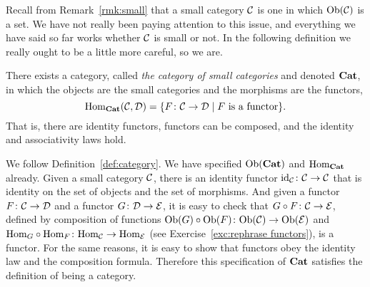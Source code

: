 \documentclass[CT4S-EN-RU]{subfiles}
\begin{document}
\begin{remarkRUS}
\end{remarkRUS}


\subsubsection{}\label{sec:cat of cats}

\begin{blockENG}
Recall from Remark~\ref{rmk:small} that a small category $\mathcal{C}$ is one in which $\textnormal{Ob}(\mathcal{C})$ is a set. We have not really been paying attention to this issue, and everything we have said so far works whether $\mathcal{C}$ is small or not. In the following definition we really ought to be a little more careful, so we are. 
\end{blockENG}

\begin{blockRUS}
\end{blockRUS}

\begin{propositionENG}
There exists a category, called {\em the category of small categories} and denoted ${\mathbf{Cat}}$, in which the objects are the small categories and the morphisms are the functors, $$\textnormal{Hom}_{\mathbf{Cat}}(\mathcal{C},\mathcal{D})=\{F\colon\mathcal{C}\rightarrow\mathcal{D}{\;|\;} F \textnormal{ is a functor}\}.$$ That is, there are identity functors, functors can be composed, and the identity and associativity laws hold.
\end{propositionENG}

\begin{propositionRUS}
\end{propositionRUS}

\begin{proofENG}
We follow Definition~\ref{def:category}. We have specified $\textnormal{Ob}({\mathbf{Cat}})$ and $\textnormal{Hom}_{\mathbf{Cat}}$ already. Given a small category $\mathcal{C}$, there is an identity functor $\textnormal{id}_\mathcal{C}\colon\mathcal{C}\rightarrow\mathcal{C}$ that is identity on the set of objects and the set of morphisms. And given a functor $F\colon\mathcal{C}\rightarrow\mathcal{D}$ and a functor $G\colon\mathcal{D}\rightarrow\mathcal{E}$, it is easy to check that $G\circ F\colon \mathcal{C}\rightarrow\mathcal{E}$, defined by composition of functions $\textnormal{Ob}(G)\circ\textnormal{Ob}(F)\colon\textnormal{Ob}(\mathcal{C})\rightarrow\textnormal{Ob}(\mathcal{E})$ and $\textnormal{Hom}_G\circ\textnormal{Hom}_F\colon\textnormal{Hom}_\mathcal{C}\rightarrow\textnormal{Hom}_\mathcal{E}$ (see Exercise~\ref{exc:rephrase functors}), is a functor. For the same reasons, it is easy to show that functors obey the identity law and the composition formula. Therefore this specification of ${\mathbf{Cat}}$ satisfies the definition of being a category. 
\end{proofENG}
\end{document}
